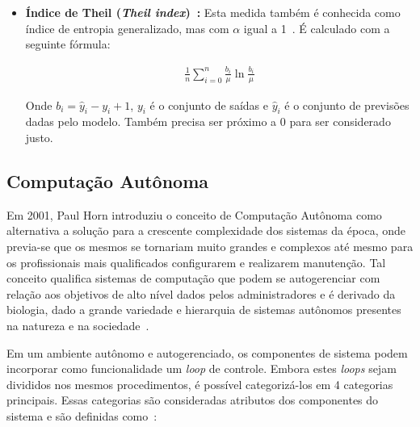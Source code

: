 \documentclass{article}
\begin{document}
\begin{itemize}
\item \textbf{Índice de Theil (\textit{Theil index})~\citep{Speicher_2018}:} Esta medida também é conhecida como índice de entropia generalizado, mas com $\alpha$ igual a 1~\citep{Speicher_2018}. É calculado com a seguinte fórmula:

\begin{align*}
\frac{1}{n}\sum^{n}_{i=0}\frac{b_i}{\mu}\ln{\frac{b_i}{\mu}}
\end{align*}

Onde $b_i = \hat{y}_i - y_i + 1$, $y_i$ é o conjunto de saídas e $\hat{y}_i$ é o conjunto de previsões dadas pelo modelo. Também precisa ser próximo a 0 para ser considerado justo.

\end{itemize}

\subsection{Computação Autônoma}

Em 2001, Paul Horn introduziu o conceito de Computação Autônoma como alternativa a solução para a crescente complexidade dos sistemas da época, onde previa-se que os mesmos se tornariam muito grandes e complexos até mesmo para os profissionais mais qualificados configurarem e realizarem manutenção. Tal conceito qualifica sistemas de computação que podem se autogerenciar com relação aos objetivos de alto nível dados pelos administradores e é derivado da biologia, dado a grande variedade e hierarquia de sistemas autônomos presentes na natureza e na sociedade~\citep{Kephart_2003}. 

Em um ambiente autônomo e autogerenciado, os componentes de sistema podem incorporar como funcionalidade um \textit{loop} de controle. Embora estes \textit{loops} sejam divididos nos mesmos procedimentos, é possível categorizá-los em 4 categorias principais. Essas categorias são consideradas atributos dos componentes do sistema e são definidas como~\citep{IBM_2005}:
\end{document}

